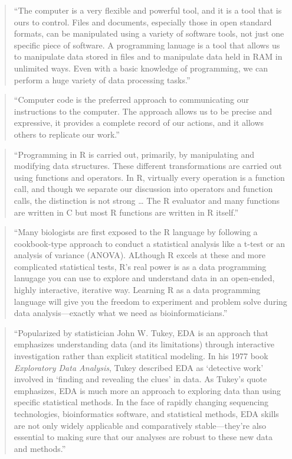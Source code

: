 \documentclass[]{tufte-book}
\begin{document}
\begin{quote}
``The computer is a very flexible and powerful tool, and it is a tool that is ours
to control. Files and documents, especially those in open standard formats, can be
manipulated using a variety of software tools, not just one specific piece of software.
A programming lanuage is a tool that allows us to manipulate data stored in files and
to manipulate data held in RAM in unlimited ways. Even with a basic knowledge of
programming, we can perform a huge variety of data processing tasks.'' \citep{murrell2009introduction}
\end{quote}

\begin{quote}
``Computer code is the preferred approach to communicating our instructions to the
computer. The approach allows us to be precise and expressive, it provides a complete
record of our actions, and it allows others to replicate our work.'' \citep{murrell2009introduction}
\end{quote}

\begin{quote}
``Programming in R is carried out, primarily, by manipulating and modifying data structures.
These different transformations are carried out using functions and operators. In R,
virtually every operation is a function call, and though we separate our discussion into
operators and function calls, the distinction is not strong \ldots{} The R evaluator and
many functions are written in C but most R functions are written in R itself.''
\citep{gentleman2008r}
\end{quote}

\begin{quote}
``Many biologists are first exposed to the R language by following a cookbook-type
approach to conduct a statistical analysis like a t-test or an analysis of
variance (ANOVA). ALthough R excels at these and more complicated statistical
tests, R's real power is as a data programming lanugage you can use to explore and
understand data in an open-ended, highly interactive, iterative way. Learning R as a
data programming language will give you the freedom to experiment and problem solve
during data analysis---exactly what we need as bioinformaticians.'' \citep{buffalo2015bioinformatics}
\end{quote}

\begin{quote}
``Popularized by statistician John W. Tukey, EDA is an approach that emphasizes
understanding data (and its limitations) through interactive investigation
rather than explicit statitical modeling. In his 1977 book \emph{Exploratory Data
Analysis}, Tukey described EDA as `detective work' involved in `finding and
revealing the clues' in data. As Tukey's quote emphasizes, EDA is much more an approach
to exploring data than using specific statistical methods. In the face of rapidly
changing sequencing technologies, bioinformatics software, and statistical methods,
EDA skills are not only widely applicable and comparatively stable---they're also
essential to making sure that our analyses are robust to these new data and methods.''
\citep{buffalo2015bioinformatics}
\end{quote}
\end{document}
